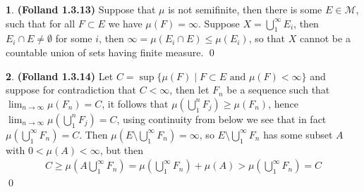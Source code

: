 \documentclass[10.5pt]{article}
\theoremstyle{definition}
\newtheorem{pb}{}
\newcommand{\set}[1]{\{#1\}}
\newcommand{\tand}{\text{ and }}
\begin{document}
    \begin{pb}\textbf{(Folland 1.3.13)}
        Suppose that \(\mu\) is not semifinite, then there is some \(E \in \mathcal{M}\), such that for all \(F \subset E\) we have \(\mu(F) = \infty\). Suppose \(X = \bigcup_1^\infty E_i\), then \(E_i \cap E \neq \emptyset\) for some \(i\), then \(\infty = \mu(E_i \cap E) \leq \mu(E_i)\), so that \(X\) cannot be a countable union of sets having finite measure. \qed
    \end{pb}
    \begin{pb}\textbf{(Folland 1.3.14)}
        Let \(C = \sup\set{\mu(F) \mid F \subset E \tand \mu(F) < \infty}\) and suppose for contradiction that \(C < \infty\), then let \(F_n\) be a sequence such that \(\lim_{n\to\infty}\mu(F_n) = C\), it follows that \(\mu(\bigcup_1^n F_j) \geq \mu(F_n)\), hence \(\lim_{n\to\infty}\mu(\bigcup_1^n F_j) = C\), using continuity from below we see that in fact \(\mu(\bigcup_1^\infty F_n) = C\). Then \(\mu(E \setminus \bigcup_1^\infty F_n) = \infty\), so \(E \setminus \bigcup_1^\infty F_n\) has some subset \(A\) with \(0 < \mu(A) < \infty\), but then
        \begin{align*}
            C \geq \mu(A\bigcup_1^\infty F_n) = \mu(\bigcup_1^\infty F_n) + \mu(A) > \mu(\bigcup_1^\infty F_n) = C
        \end{align*} \qed
    \end{pb}
\end{document}
